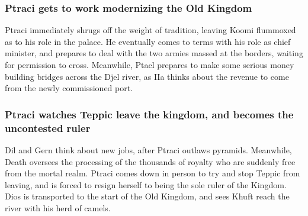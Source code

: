 \subsubsection{\Gls{Ptraci} gets to work modernizing the Old Kingdom}
\Gls{Ptraci} immediately shrugs off the weight of tradition, leaving \Gls{Koomi} flummoxed as to his
role in the palace. He eventually comes to terms with his role as chief minister, and prepares to
deal with the two armies massed at the borders, waiting for permission to cross. Meanwhile,
\Gls{Ptacl} prepares to make some serious money building bridges across the Djel river, as \Gls{IIa}
thinks about the revenue to come from the newly commissioned port.

\subsubsection{\Gls{Ptraci} watches \Gls{Teppic} leave the kingdom, and becomes the uncontested
    ruler}
\Gls{Dil} and \Gls{Gern} think about new jobs, after \Gls{Ptraci} outlaws pyramids. Meanwhile,
\Gls{Death} oversees the processing of the thousands of royalty who are suddenly free from the
mortal realm. \Gls{Ptraci} comes down in person to try and stop \Gls{Teppic} from leaving, and is
forced to resign herself to being the sole ruler of the Kingdom. \Gls{Dios} is transported to the
start of the Old Kingdom, and sees \Gls{Khuft} reach the river with his herd of camels.